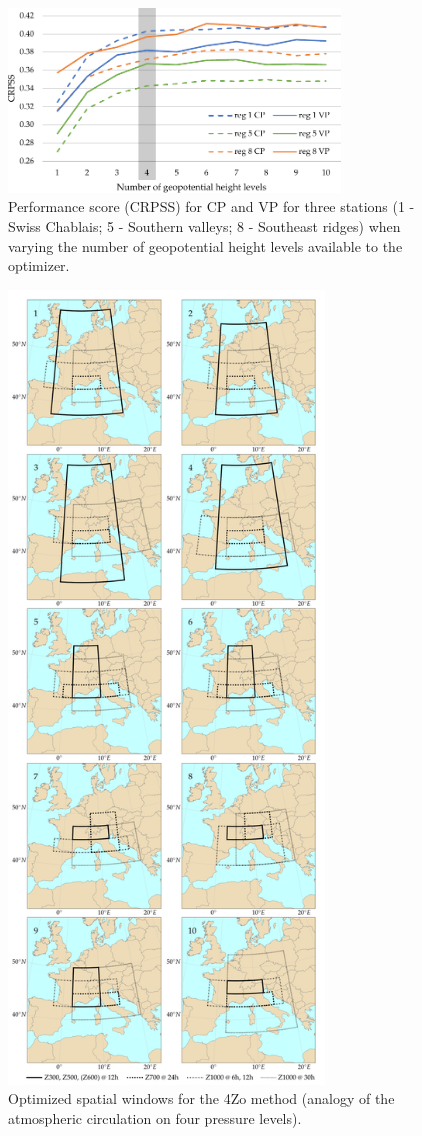\documentclass[review]{elsarticle}
\begin{document}
\begin{figure}[t]
	\centerline{\includegraphics[width=8.8cm]{figures/fig02.pdf}}
	\caption{Performance score (CRPSS) for CP and VP for three stations (1 - Swiss Chablais; 5 - Southern valleys; 8 - Southeast ridges) when varying the number of geopotential height levels available to the optimizer.}
	\label{fig:figure_nb_levels}
\end{figure}

\begin{figure}[t]
	\centerline{\includegraphics[width=8.4cm]{figures/fig03.pdf}}
	\caption{Optimized spatial windows for the 4Zo method (analogy of the atmospheric circulation on four pressure levels).}
	\label{fig:spatial_windows_4Zo}
\end{figure}
\end{document}
